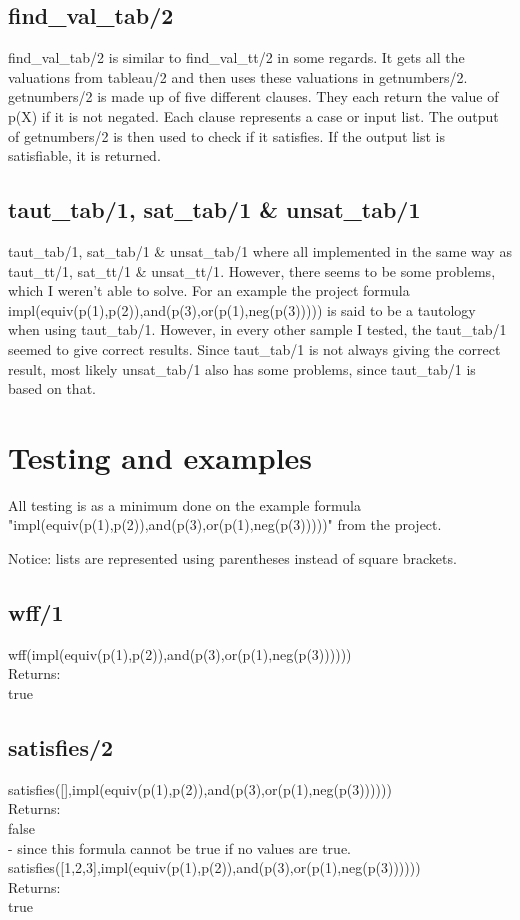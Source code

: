 \documentclass[a4paper,10pt]{article}
\begin{document}
\subsection{find\_val\_tab/2}
\textsf{find\_val\_tab/2} is similar to \textsf{find\_val\_tt/2} in some regards. It gets all the valuations from \textsf{tableau/2} and then uses these valuations in \textsf{getnumbers/2}. \textsf{getnumbers/2} is made up of five different clauses. They each return the value of \textsf{p(X)} if it is not negated. Each clause represents a case or input list. The output of \textsf{getnumbers/2} is then used to check if it satisfies. If the output list is satisfiable, it is returned.
\subsection{taut\_tab/1, sat\_tab/1 \& unsat\_tab/1}
\textsf{taut\_tab/1, sat\_tab/1 \& unsat\_tab/1} where all implemented in the same way as \textsf{taut\_tt/1, sat\_tt/1 \& unsat\_tt/1}. However, there seems to be some problems, which I weren't able to solve. For an example the project formula\\ impl(equiv(p(1),p(2)),and(p(3),or(p(1),neg(p(3))))) is said to be a tautology when using \textsf{taut\_tab/1}. However, in every other sample I tested, the \textsf{taut\_tab/1} seemed to give correct results. Since \textsf{taut\_tab/1} is not always giving the correct result, most likely \textsf{unsat\_tab/1} also has some problems, since \textsf{taut\_tab/1} is based on that.
\section{Testing and examples}
All testing is as a minimum done on the example formula\\ "impl(equiv(p(1),p(2)),and(p(3),or(p(1),neg(p(3)))))" from the project.

Notice: lists are represented using parentheses instead of square brackets.
\subsection*{wff/1}
\textsf{wff(impl(equiv(p(1),p(2)),and(p(3),or(p(1),neg(p(3))))))}\\
Returns:\\
\textsf{true}
\subsection*{satisfies/2}
\textsf{satisfies([],impl(equiv(p(1),p(2)),and(p(3),or(p(1),neg(p(3))))))}\\
Returns:\\
\textsf{false}\\
- since this formula cannot be true if no values are true.\\
\textsf{satisfies([1,2,3],impl(equiv(p(1),p(2)),and(p(3),or(p(1),neg(p(3))))))}\\
Returns:\\
\textsf{true}
\end{document}
